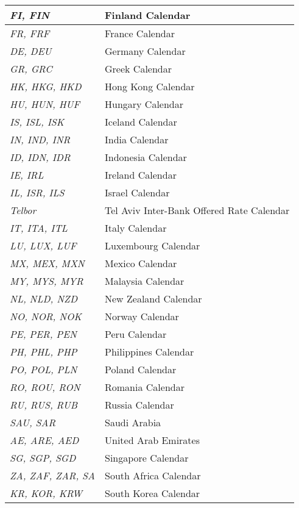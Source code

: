 \begin{longtable}{| p{} | p{} |}
    \emph{FI, FIN} & Finland Calendar \\ \hline
    \emph{FR, FRF} & France Calendar \\ \hline
    \emph{DE, DEU} & Germany Calendar \\ \hline
    \emph{GR, GRC} & Greek Calendar \\ \hline
    \emph{HK, HKG, HKD} & Hong Kong Calendar \\ \hline
    \emph{HU, HUN, HUF} & Hungary Calendar \\ \hline
    \emph{IS, ISL, ISK} & Iceland Calendar \\ \hline
    \emph{IN, IND, INR} & India Calendar \\ \hline
    \emph{ID, IDN, IDR} & Indonesia Calendar \\ \hline
    \emph{IE, IRL} & Ireland Calendar \\ \hline
    \emph{IL, ISR, ILS} & Israel Calendar \\ \hline
    \emph{Telbor} & Tel Aviv Inter-Bank Offered Rate Calendar \\ \hline
    \emph{IT, ITA, ITL} & Italy Calendar \\ \hline
    \emph{LU, LUX, LUF} & Luxembourg Calendar \\ \hline    
    \emph{MX, MEX, MXN} & Mexico Calendar \\ \hline
    \emph{MY, MYS, MYR} & Malaysia Calendar \\ \hline
    \emph{NL, NLD, NZD} & New Zealand Calendar\\ \hline
    \emph{NO, NOR, NOK} & Norway Calendar \\ \hline
    \emph{PE, PER, PEN} & Peru Calendar \\ \hline
    \emph{PH, PHL, PHP} & Philippines Calendar \\ \hline
    \emph{PO, POL, PLN} & Poland Calendar \\ \hline
    \emph{RO, ROU, RON} & Romania Calendar \\ \hline
    \emph{RU, RUS, RUB} & Russia Calendar \\ \hline
    \emph{SAU, SAR} & Saudi Arabia \\ \hline
    \emph{AE, ARE, AED} & United Arab Emirates \\ \hline
    \emph{SG, SGP, SGD} & Singapore Calendar \\ \hline
    \emph{ZA, ZAF, ZAR, SA} & South Africa Calendar \\ \hline    
    \emph{KR, KOR, KRW} & South Korea Calendar \\ \hline

\end{longtable}
